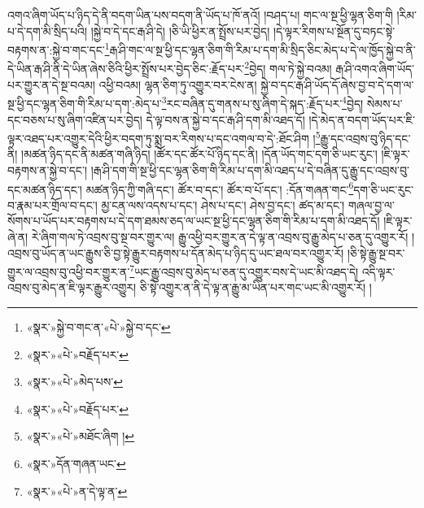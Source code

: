 འགའ་ཞིག་ཡོད་པ་ཉིད་དེ་ནི་བདག་ཡིན་པས་བདག་ནི་ཡོད་པ་ཁོ་ནའོ། །བཤད་པ། གང་ལ་སྔ་ཕྱི་ལྷན་ཅིག་གི །རིམ་པ་དེ་དག་མི་སྲིད་པའི། །སྐྱེ་བ་དེ་དང་རྒ་ཤི་དེ། །ཅི་ཡི་ཕྱིར་ན་སྤྲོས་པར་བྱེད། །དེ་ལྟར་རིགས་པ་སྔོན་དུ་བཏང་སྟེ་བརྟགས་ན་:སྐྱེ་བ་གང་དང་\footnote{«སྣར་»སྐྱེ་བ་གང་ན་«པེ་»སྐྱེ་བ་དང་}རྒ་ཤི་གང་ལ་སྔ་ཕྱི་དང་ལྷན་ཅིག་གི་རིམ་པ་དག་མི་སྲིད་ཅིང་མེད་པ་དེ་ལ་ཁྱོད་སྐྱེ་བ་ནི་དེ་ཡིན་རྒ་ཤི་ནི་དེ་ཡིན་ཞེས་ཅིའི་ཕྱིར་སྤྲོས་པར་བྱེད་ཅིང་:རྗོད་པར་\footnote{«སྣར་»«པེ་»བརྗོད་པར་}བྱེད། གལ་ཏེ་སྐྱེ་བའམ། རྒ་ཤི་འགའ་ཞིག་ཡོད་པར་གྱུར་ན་དེ་སྔ་བའམ། འཕྱི་བའམ། ལྷན་ཅིག་ཏུ་འགྱུར་བར་ངེས་ན། སྐྱེ་བ་དང་རྒ་ཤི་ཡོད་དོ་ཞེས་བྱ་བ་དེ་དག་ལ་སྔ་ཕྱི་དང་ལྷན་ཅིག་གི་རིམ་པ་དག་:མེད་པ་\footnote{«སྣར་»«པེ་»མེད་པས་}རང་བཞིན་དུ་གནས་པ་སུ་ཞིག་དེ་སྐད་:རྗོད་པར་\footnote{«སྣར་»«པེ་»བརྗོད་པར་}བྱེད། སེམས་པ་དང་བཅས་པ་སུ་ཞིག་འཛིན་པར་བྱེད། དེ་ལྟ་བས་ན་སྐྱེ་བ་དང་རྒ་ཤི་དག་མི་འཐད་དོ། །དེ་མེད་ན་བདག་ཡོད་པར་ཇི་ལྟར་འཐད་པར་འགྱུར་དེའི་ཕྱིར་བདག་ཏུ་སྨྲ་བར་རིགས་པ་དང་འགལ་བ་དེ་:ཐོང་ཤིག །\footnote{«སྣར་»«པེ་»མཐོང་ཞིག །}རྒྱུ་དང་འབྲས་བུ་ཉིད་དང་ནི། །མཚན་ཉིད་དང་ནི་མཚན་གཞི་ཉིད། །ཚོར་དང་ཚོར་པོ་ཉིད་དང་ནི། །དོན་ཡོད་གང་དག་ཅི་ཡང་རུང་། །ཇི་ལྟར་བརྟགས་ན་སྐྱེ་བ་དང་། །རྒ་ཤི་དག་གི་སྔ་ཕྱི་དང་ལྷན་ཅིག་གི་རིམ་པ་དག་མི་འཐད་པ་དེ་བཞིན་དུ་རྒྱུ་དང་འབྲས་བུ་དང་མཚན་ཉིད་དང་། མཚན་ཉིད་ཀྱི་གཞི་དང་། ཚོར་བ་དང་། ཚོར་བ་པོ་དང་། :དོན་གཞན་གང་\footnote{«སྣར་»དོན་གཞན་ཡང་}དག་ཅི་ཡང་རུང་བ་རྣམ་པར་གྲོལ་བ་དང་། མྱ་ངན་ལས་འདས་པ་དང་། ཤེས་པ་དང་། ཤེས་བྱ་དང་། ཚད་མ་དང་། གཞལ་བྱ་ལ་སོགས་པ་ཡོད་པར་བརྟགས་པ་དེ་དག་ཐམས་ཅད་ལ་ཡང་སྔ་ཕྱི་དང་ལྷན་ཅིག་གི་རིམ་པ་དག་མི་འཐད་དོ། །ཇི་ལྟར་ཞེ་ན། རེ་ཞིག་གལ་ཏེ་འབྲས་བུ་སྔ་བར་གྱུར་ལ། རྒྱུ་འཕྱི་བར་གྱུར་ན་དེ་ལྟ་ན་འབྲས་བུ་རྒྱུ་མེད་པ་ཅན་དུ་འགྱུར་རོ། །འབྲས་བུ་ཡོད་ན་ཡང་རྒྱུས་ཅི་བྱ་སྟེ་རྒྱུར་བརྟགས་པ་དོན་མེད་པ་ཉིད་དུ་ཡང་ཐལ་བར་འགྱུར་རོ། །ཅི་སྟེ་རྒྱུ་སྔ་བར་གྱུར་ལ་འབྲས་བུ་འཕྱི་བར་གྱུར་ན་\footnote{«སྣར་»«པེ་»ན་དེ་ལྟ་ན་}ཡང་རྒྱུ་འབྲས་བུ་མེད་པ་ཅན་དུ་འགྱུར་བས་དེ་ཡང་མི་འཐད་དེ། འདི་ལྟར་འབྲས་བུ་མེད་ན་ཇི་ལྟར་རྒྱུར་འགྱུར། ཅི་སྟེ་འགྱུར་ན་ནི་དེ་ལྟ་ན་རྒྱུ་མ་ཡིན་པར་གང་ཡང་མི་འགྱུར་རོ། །
